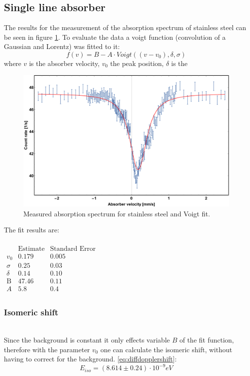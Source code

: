\subsection{Single line absorber}
The results for the measurement of the absorption spectrum of stainless steel can be seen in figure \ref{fig:single line absorber:fitresult}. To evaluate the data a voigt function (convolution of a Gaussian and Lorentz) was fitted to it:
\begin{equation}
f(v)=B- A \cdot Voigt((v-v_0),\delta,\sigma )
\end{equation}
where $v$ is the absorber velocity, $v_0$ the peak position, $\delta$ is the 
\begin{figure}[H]
\centering
\includegraphics[width=1.0\linewidth]{../results/steel/voigtfittry.pdf}
\caption[Stainless steel spectrum]{Measured absorption spectrum for stainless steel and Voigt fit.}
\label{fig:single line absorber:fitresult}
\end{figure}
The fit results are:\\ \ \\
$\begin{array}{l|llll}
\text{} & \text{Estimate} & \text{Standard Error} \\
\hline
v_0 & 0.179 & 0.005\\
\sigma  & 0.25 & 0.03 \\
\delta  & 0.14 & 0.10\\
\text{B} & 47.46 & 0.11\\
A & 5.8 & 0.4 &\\
\end{array}$

\subsubsection{Isomeric shift} \ \\
Since the background is constant it only effects variable $B$ of the fit function, therefore
with the parameter $v_0$ one can calculate the isomeric shift, without having to correct for the background. \ref{eq:diffdopplershift}:
\begin{equation}
E_{iso} = (8.614\pm0.24)\cdot 10^{-9} eV
\end{equation}
